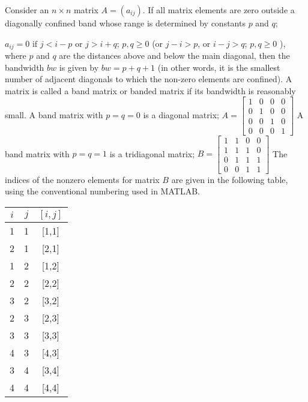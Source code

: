 \vskip 5pt
\noindent
Consider an $n \times n$ matrix $A=(a_{ij})$.  If all matrix elements are zero
outside a diagonally confined band whose range is determined by constants $p$
and $q$;

\vskip 7pt
\noindent
\phantom{.} \hskip 20mm $a_{ij}=0$   $\text{if}$   $j<i-p$   $\text{or}$ $j>i+q$; $p,q \geq 0$
\vskip 7pt
\noindent
(or $j-i>p$, or $i-j>q$; $p, q \geq 0$ ), where $p$ and $q$ are the distances
above and below the main diagonal, then the bandwidth  $bw$ is given by
$bw=p+q+1$ (in other words, it is the smallest number of adjacent diagonals to
which the non-zero elements are confined).
\vskip 6pt
\noindent
A matrix is called a band matrix or banded matrix if its bandwidth is reasonably
small.
\vskip 6pt
\noindent
A band matrix with $p=q=0$ is a diagonal matrix; $
A=
\begin{bmatrix}
1 & 0 & 0 & 0  \\
0 & 1 & 0 & 0  \\
0 & 0 & 1 & 0  \\
0 & 0 & 0 & 1
\end{bmatrix}
$
\vskip 8pt
\noindent
A band matrix with $p=q=1$ is a tridiagonal matrix; $
B=
\begin{bmatrix}
1 & 1 & 0 & 0  \\
1 & 1 & 1 & 0  \\
0 & 1 & 1 & 1  \\
0 & 0 & 1 & 1
\end{bmatrix}
$
\vskip 8pt
\noindent
The indices of the nonzero elements for matrix $B$ are given in the following
table, using the conventional numbering used in MATLAB.
\vskip 10pt
\begin{center}
    \begin{tabular}{ c  c  c }
    $i$   &$j$   &$[i,j]$\\
    \hline
     1    & 1    & [1,1] \\
     2    & 1    & [2,1] \\
     1    & 2    & [1,2] \\
     2    & 2    & [2,2] \\
     3    & 2    & [3,2] \\
     2    & 3    & [2,3] \\
     3    & 3    & [3,3] \\
     4    & 3    & [4,3] \\
     3    & 4    & [3,4] \\
     4    & 4    & [4,4] \\
    \end{tabular}
\end{center}

